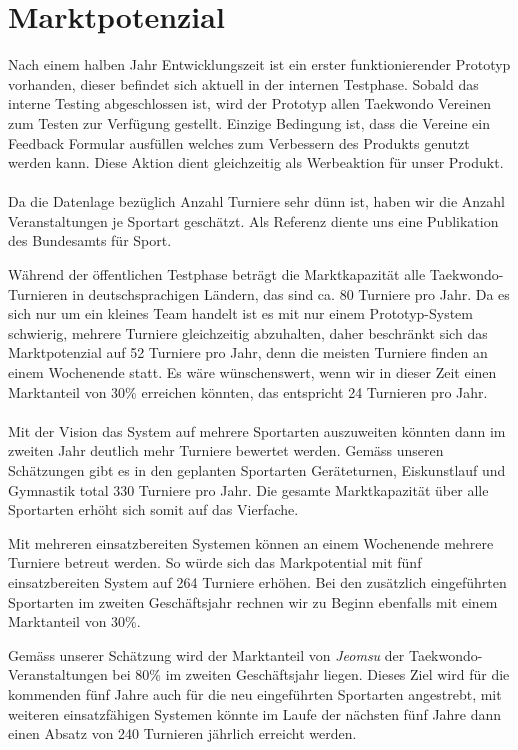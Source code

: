 \section{Marktpotenzial}\label{marktpotenzial}

Nach einem halben Jahr Entwicklungszeit ist ein erster funktionierender Prototyp vorhanden, dieser befindet sich aktuell in
der internen Testphase.
Sobald das interne Testing abgeschlossen ist, wird der Prototyp allen Taekwondo Vereinen zum Testen zur Verfügung gestellt.
Einzige Bedingung ist, dass die Vereine ein Feedback Formular ausfüllen welches zum Verbessern des Produkts genutzt werden kann.
Diese Aktion dient gleichzeitig als Werbeaktion für unser Produkt.
\\\\

Da die Datenlage bezüglich Anzahl Turniere sehr dünn ist, haben wir die Anzahl Veranstaltungen je Sportart geschätzt.
Als Referenz diente uns eine Publikation des Bundesamts für Sport. \parencite[S.~9]{baspo}

Während der öffentlichen Testphase beträgt die Marktkapazität alle Taekwondo-Turnieren in deutschsprachigen Ländern, das
sind ca. 80 Turniere pro Jahr.
Da es sich nur um ein kleines Team handelt ist es mit nur einem Prototyp-System schwierig, mehrere Turniere
	gleichzeitig abzuhalten, daher beschränkt sich das Marktpotenzial auf 52 Turniere pro Jahr, denn die meisten
	Turniere finden an einem Wochenende statt.
Es wäre wünschenswert, wenn wir in dieser Zeit einen Marktanteil von 30\% erreichen könnten, das entspricht 24
	Turnieren pro Jahr.
\\\\

Mit der Vision das System auf mehrere Sportarten auszuweiten könnten dann im zweiten Jahr deutlich mehr Turniere bewertet werden.
Gemäss unseren Schätzungen gibt es in den geplanten Sportarten Geräteturnen, Eiskunstlauf und Gymnastik total 330 Turniere pro Jahr.
Die gesamte Marktkapazität über alle Sportarten erhöht sich somit auf das Vierfache.

Mit mehreren einsatzbereiten Systemen können an einem Wochenende mehrere Turniere betreut werden.
So würde sich das Markpotential mit fünf einsatzbereiten System auf 264 Turniere erhöhen.
Bei den zusätzlich eingeführten Sportarten im zweiten Geschäftsjahr rechnen wir zu Beginn ebenfalls mit einem Marktanteil von 30\%.

Gemäss unserer Schätzung wird der Marktanteil von \textit{Jeomsu} der Taekwondo-Veranstaltungen bei 80\% im zweiten Geschäftsjahr liegen.
Dieses Ziel wird für die kommenden fünf Jahre auch für die neu eingeführten Sportarten angestrebt, mit weiteren
	einsatzfähigen Systemen könnte im Laufe der nächsten fünf Jahre dann einen Absatz von 240 Turnieren jährlich
	erreicht werden.


